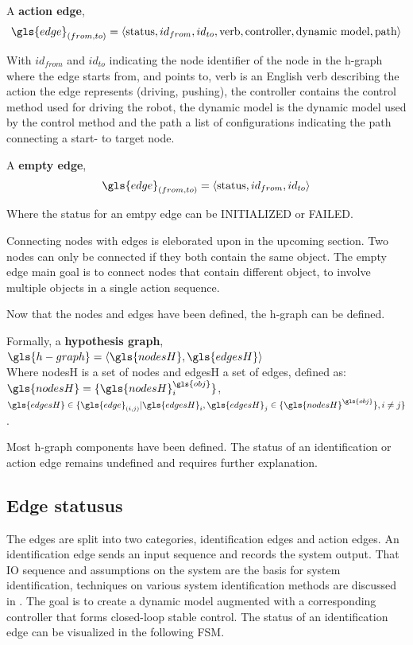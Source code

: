 A \textbf{action edge}, \[\gls{edge}_{(from, to)} = \left\langle \textrm{status}, id_{from}, id_{to}, \textrm{verb}, \textrm{controller},\textrm{dynamic model}, \textrm{path}\right\rangle\]\bs

With $id_{from}$ and $id_{to}$ indicating the node identifier of the node in the \ac{h-graph} where the edge starts from, and points to, verb is an English verb describing the action the edge represents (driving, pushing), the controller contains the control method used for driving the robot, the dynamic model is the dynamic model used by the control method and the path a list of configurations indicating the path connecting a start- to target node.\bs

A \textbf{empty edge}, \[\gls{edge}_{(from, to)} = \left\langle \textrm{status}, id_{from}, id_{to}\right\rangle\]\bs

Where the status for an emtpy edge can be INITIALIZED or FAILED.\bs

Connecting nodes with edges is eleborated upon in the upcoming section. Two nodes can only be connected if they both contain the same object. The empty edge main goal is to connect nodes that contain different object, to involve multiple objects in a single  action sequence.\bs

Now that the nodes and edges have been defined, the \ac{h-graph} can be defined.\bs

Formally, a \textbf{hypothesis graph}, $\gls{h-graph} = \left\langle \gls{nodesH}, \gls{edgesH} \right\rangle $
\\ Where \gls{nodesH} is a set of nodes and \gls{edgesH} a set of edges, defined as: $\gls{nodesH} = \{\gls{nodesH}^{\gls{obj}}_{i}\}$, \quad $\gls{edgesH} \in \{\gls{edge}_{(i,j)}| \gls{edgesH}_i, \gls{edgesH}_j \in \{\gls{nodesH}^{\gls{obj}} \}, i \neq j\}$.\bs

Most \ac{h-graph} components have been defined. The status of an identification or action edge remains undefined and requires further explanation.\bs

\subsection{Edge statusus}
The edges are split into two categories, identification edges and action edges. An identification edge sends an input sequence and records the system output. That \ac{IO} sequence and assumptions on the system are the basis for system identification, techniques on various system identification methods are discussed in . The goal is to create a dynamic model augmented with a corresponding controller that forms closed-loop stable control. The status of an identification edge can be visualized in the following \ac{FSM}.\bs

